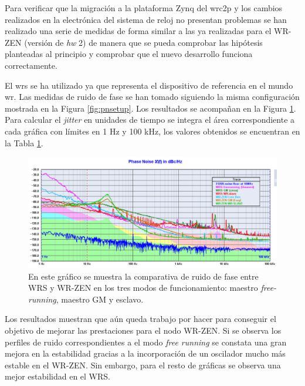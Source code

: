Para verificar que la migración a la plataforma Zynq del \gls{wrc2p} y los 
cambios realizados en la electrónica del sistema de reloj no presentan 
problemas se han realizado una serie de medidas de forma similar a las ya 
realizadas para el WR-ZEN (versión de \textit{hw} 2) de manera que se pueda 
comprobar las hipótesis 
planteadas al principio y comprobar que el nuevo desarrollo funciona 
correctamente.

El \gls{wrs} se ha utilizado ya que representa el dispositivo de referencia en 
el mundo \gls{wr}. Las medidas de ruido de fase se han tomado siguiendo la 
misma configuración mostrada en la Figura \ref{fig:pnsetup}. Los resultados se 
acompañan en la Figura \ref{fig:compall}. Para calcular el \textit{jitter} en 
unidades de tiempo se integra el área correspondiente a cada gráfica con 
límites en 1 Hz y 100 kHz, los valores obtenidos se encuentran en la Tabla 
\ref{fig:compall}. 

\begin{figure}
	\centering
	\includegraphics[width=\linewidth]{imagenes/comp_all}
	\caption[Comparativa de \textit{Phase Noise} entre WRS y WR-ZEN]{En este 
	gráfico se muestra la comparativa de ruido de fase entre WRS y WR-ZEN en 
	los tres modos de funcionamiento: maestro \textit{free-running}, maestro GM 
	y esclavo.}
	\label{fig:compall}
\end{figure}

Los resultados muestran que aún queda trabajo por hacer para conseguir el 
objetivo de mejorar las prestaciones para el nodo WR-ZEN. Si se observa los 
perfiles de ruido correspondientes a el modo \textit{free running} se constata 
una gran mejora en la estabilidad gracias a la incorporación de un oscilador 
mucho más estable en el WR-ZEN. Sin embargo, para el resto de gráficas se 
observa una mejor estabilidad en el WRS.


